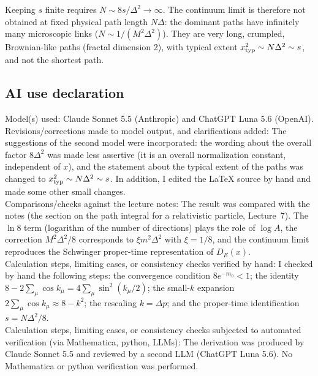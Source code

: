 \documentclass[11pt]{article}
\begin{document}
Keeping $s$ finite requires $N\sim 8s/\Delta^2\to\infty$. The continuum limit is therefore not obtained
at fixed physical path length $N\Delta$: the dominant paths have infinitely many microscopic links
($N\sim 1/(M^2\Delta^2)$). They are very long, crumpled, Brownian-like paths (fractal dimension 2),
with typical extent $x^2_{\rm typ}\sim N\Delta^2\sim s$, and not the shortest path.

\subsection*{AI use declaration}

Model(s) used: Claude Sonnet 5.5 (Anthropic) and ChatGPT Luna 5.6 (OpenAI).\\

Revisions/corrections made to model output, and clarifications added:
The suggestions of the second model were incorporated: the wording about the overall factor
$8\Delta^2$ was made less assertive (it is an overall normalization constant, independent of $x$),
and the statement about the typical extent of the paths was changed to
$x^2_{\rm typ}\sim N\Delta^2\sim s$. In addition, I edited the \LaTeX{} source by hand and made some other small changes.\\

Comparisons/checks against the lecture notes:
The result was compared with the notes (the section on the path integral for a relativistic particle,
Lecture~7). The $\ln 8$ term (logarithm of the number of directions) plays the role of $\log A$,
the correction $M^2\Delta^2/8$ corresponds to $\xi m^2\Delta^2$ with $\xi=1/8$, and the continuum
limit reproduces the Schwinger proper-time representation of $D_E(x)$.\\

Calculation steps, limiting cases, or consistency checks verified by hand:
I checked by hand the following steps: the convergence condition $8e^{-m_0}<1$; the identity
$8-2\sum_\mu\cos k_\mu=4\sum_\mu\sin^2(k_\mu/2)$; the small-$k$ expansion
$2\sum_\mu\cos k_\mu\approx 8-k^2$; the rescaling $k=\Delta p$; and the proper-time identification
$s=N\Delta^2/8$.\\

Calculation steps, limiting cases, or consistency checks subjected to automated verification
(via Mathematica, python, LLMs):
The derivation was produced by Claude Sonnet 5.5 and reviewed by a second LLM (ChatGPT Luna 5.6).
No Mathematica or python verification was performed.
\end{document}
